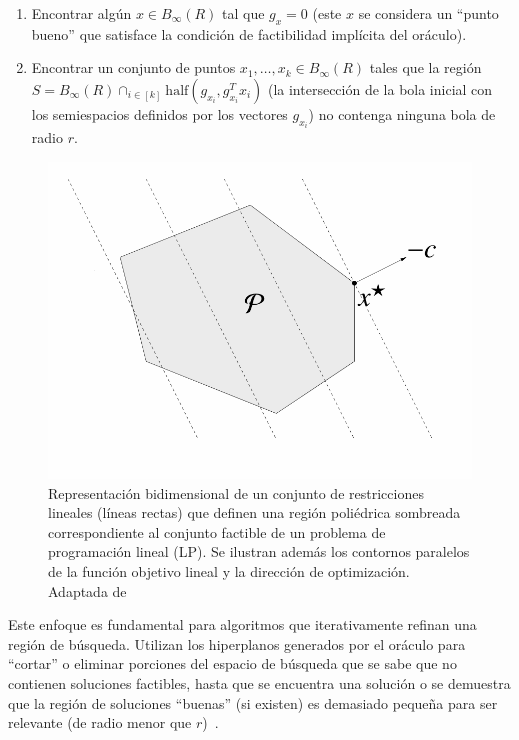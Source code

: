 \begin{enumerate}
    \item Encontrar algún $x \in B_\infty(R)$ tal que $g_x = 0$ (este $x$ se considera un ``punto bueno'' que satisface
          la condición de factibilidad implícita del oráculo).
    \item Encontrar un conjunto de puntos $x_1, \dots, x_k \in B_\infty(R)$ tales que la región
          $S = B_\infty(R) \cap_{i \in [k]} \text{half}(g_{x_i}, g_{x_i}^T x_i)$ (la intersección de la bola inicial
          con los semiespacios definidos por los vectores $g_{x_i}$) no contenga ninguna bola de radio $r$.
\end{enumerate}

\begin{figure}
    \centering
    \includegraphics[width=0.75\linewidth]{img//marcoTeorico/optimizacion_fig2.png}
    \caption{Representación bidimensional de un conjunto de restricciones lineales (líneas rectas) que definen una región poliédrica sombreada correspondiente al conjunto factible de un problema de programación lineal (LP). Se ilustran además los contornos paralelos de la función objetivo lineal y la dirección de optimización. Adaptada de~\cite[p.~101]{BoydVandenbergheSlides2023}}%
    \label{fig:optimization2}
\end{figure}

Este enfoque es fundamental para algoritmos que iterativamente refinan una región de búsqueda. Utilizan los hiperplanos
generados por el oráculo para ``cortar'' o eliminar porciones del espacio de búsqueda que se sabe que no contienen
soluciones factibles, hasta que se encuentra una solución o se demuestra que la región de soluciones ``buenas'' (si existen)
es demasiado pequeña para ser relevante (de radio menor que $r$)~\cite[pp.~1, 5]{Sidford2020}.


